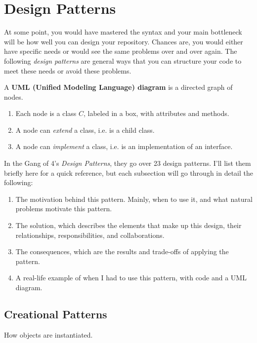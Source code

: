 \section{Design Patterns} 

  At some point, you would have mastered the syntax and your main bottleneck will be how well you can design your repository. Chances are, you would either have specific needs or would see the same problems over and over again. The following \textit{design patterns} are general ways that you can structure your code to meet these needs or avoid these problems. 

  \begin{definition}
    A \textbf{UML (Unified Modeling Language) diagram} is a directed graph of nodes. 
    \begin{enumerate}
      \item Each node is a class $C$, labeled in a box, with attributes and methods. 
      \item A node can \textit{extend} a class, i.e. is a child class. 
      \item A node can \textit{implement} a class, i.e. is an implementation of an interface. 
    \end{enumerate}
  \end{definition} 

  In the Gang of 4's \textit{Design Patterns}, they go over 23 design patterns. I'll list them briefly here for a quick reference, but each subsection will go through in detail the following: 
  \begin{enumerate}
    \item The motivation behind this pattern. Mainly, when to use it, and what natural problems motivate this pattern.  
    \item The solution, which describes the elements that make up this design, their relationships, responsibilities, and collaborations. 
    \item The consequences, which are the results and trade-offs of applying the pattern. 
    \item A real-life example of when I had to use this pattern, with code and a UML diagram. 
  \end{enumerate}

\subsection{Creational Patterns} 

  How objects are instantiated. 

